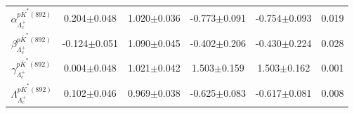 \begin{table}[h]
{\begin{tabular}{cccccc}
            $\alpha_{\Lambda_c^+}^{p\overline{K}^*(892)}$ & 0.204$\pm$0.048 & 1.020$\pm$0.036 & -0.773$\pm$0.091 & -0.754$\pm$0.093 & 0.019\\
            $\beta_{\Lambda_c^+}^{p\overline{K}^*(892)}$ & -0.124$\pm$0.051 & 1.090$\pm$0.045 & -0.402$\pm$0.206 & -0.430$\pm$0.224 & 0.028\\
            $\gamma_{\Lambda_c^+}^{p\overline{K}^*(892)}$ & 0.004$\pm$0.048 & 1.021$\pm$0.042 & 1.503$\pm$0.159 & 1.503$\pm$0.162 & 0.001\\
            $\Lambda_{\Lambda_c^+}^{p\overline{K}^*(892)}$ & 0.102$\pm$0.046 & 0.969$\pm$0.038 & -0.625$\pm$0.083 & -0.617$\pm$0.081 & 0.008\\
        \hline\hline
        \end{tabular}
        }
\end{table}


